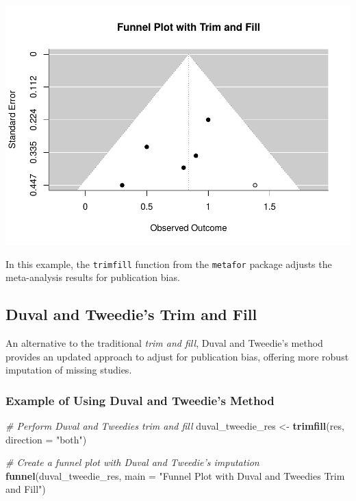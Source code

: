 \documentclass[
]{book}
\newenvironment{Shaded}{\begin{snugshade}}{\end{snugshade}}
\newcommand{\AttributeTok}[1]{\textcolor[rgb]{0.13,0.29,0.53}{#1}}
\newcommand{\CommentTok}[1]{\textcolor[rgb]{0.56,0.35,0.01}{\textit{#1}}}
\newcommand{\FunctionTok}[1]{\textcolor[rgb]{0.13,0.29,0.53}{\textbf{#1}}}
\newcommand{\NormalTok}[1]{#1}
\newcommand{\OtherTok}[1]{\textcolor[rgb]{0.56,0.35,0.01}{#1}}
\newcommand{\StringTok}[1]{\textcolor[rgb]{0.31,0.60,0.02}{#1}}
\begin{document}
\includegraphics{_main_files/figure-latex/unnamed-chunk-33-1.pdf}

In this example, the \texttt{trimfill} function from the \texttt{metafor} package adjusts the meta-analysis results for publication bias.

\subsection{Duval and Tweedie's Trim and Fill}\label{duval-and-tweedies-trim-and-fill}

An alternative to the traditional \emph{trim and fill}, Duval and Tweedie's method provides an updated approach to adjust for publication bias, offering more robust imputation of missing studies.

\subsubsection{Example of Using Duval and Tweedie's Method}\label{example-of-using-duval-and-tweedies-method}

\begin{Shaded}
\begin{Highlighting}[]
\CommentTok{\# Perform Duval and Tweedie\textquotesingle{}s trim and fill}
\NormalTok{duval\_tweedie\_res }\OtherTok{\textless{}{-}} \FunctionTok{trimfill}\NormalTok{(res, }\AttributeTok{direction =} \StringTok{"both"}\NormalTok{)}

\CommentTok{\# Create a funnel plot with Duval and Tweedie’s imputation}
\FunctionTok{funnel}\NormalTok{(duval\_tweedie\_res, }\AttributeTok{main =} \StringTok{"Funnel Plot with Duval and Tweedie\textquotesingle{}s Trim and Fill"}\NormalTok{)}
\end{Highlighting}
\end{Shaded}
\end{document}
